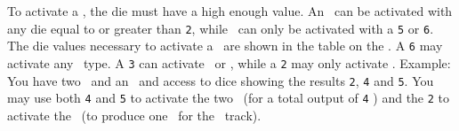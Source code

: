 To activate a \fortification, the die must have a high enough value.  An \academy\ can be activated with any die equal to or greater than \texttt{2}, while \starships\ can only be activated with a \texttt{5} or \texttt{6}.  The die values necessary to activate a \fortification\ are shown in the table on the \planetsheet.
\newline\newline
A \texttt{6} may activate any \fortification\ type. A \texttt{3} can activate \factory\ or \academy, while a \texttt{2} may only activate \academy.
\newline\newline
Example: You have two \labs\ and an \academy\ and access to dice showing the results \texttt{2}, \texttt{4} and \texttt{5}.  You may use both \texttt{4} and \texttt{5} to activate the two \labs\ (for a total output of \texttt{4} \tech) and the \texttt{2} to activate the \academy\ (to produce one \astronaut\ for the \population\ track).

